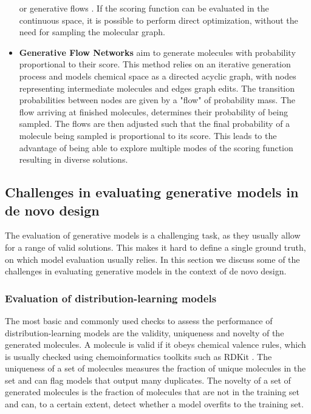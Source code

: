 \begin{itemize}
          or generative flows \citep{madhawaGraphNVPInvertibleFlow2019}. If the scoring function
          can be evaluated in the continuous space, it is possible to perform direct optimization,
          without the need for sampling the molecular graph.
    \item \textbf{Generative Flow Networks} \citep{bengioFlowNetworkBased2021} aim to generate
          molecules with probability proportional to their score. This method relies on an
          iterative generation process and models chemical space as a directed acyclic graph, with
          nodes representing intermediate molecules and edges graph edits. The transition
          probabilities between nodes are given by a "flow" of probability mass. The flow arriving
          at finished molecules, determines their probability of being sampled. The flows are
          then adjusted such that the final probability of a molecule being sampled is
          proportional to its score. This leads to the advantage of being able to explore multiple
          modes of the scoring function resulting in diverse solutions.
\end{itemize}

\subsection{Challenges in evaluating generative models in de novo design}

The evaluation of generative models is a challenging task, as they usually allow for a
range of valid solutions. This makes it hard to define a single ground truth, on which model
evaluation usually relies. In this section we discuss some of the challenges in evaluating
generative models in the context of de novo design.

\subsubsection{Evaluation of distribution-learning models}
The most basic and commonly used checks to assess the performance of distribution-learning models
are the validity, uniqueness and novelty of the generated molecules. A molecule is valid if it obeys
chemical valence rules, which is usually checked using chemoinformatics toolkits such as RDKit
\citep{landrumRDKitOpensourceCheminformatics2006}. The uniqueness of a set of molecules measures the
fraction of unique molecules in the set and can flag models that output many duplicates. The novelty
of a set of generated molecules is the fraction of molecules that are not in the training set and
can, to a certain extent, detect whether a model overfits to the training set.

